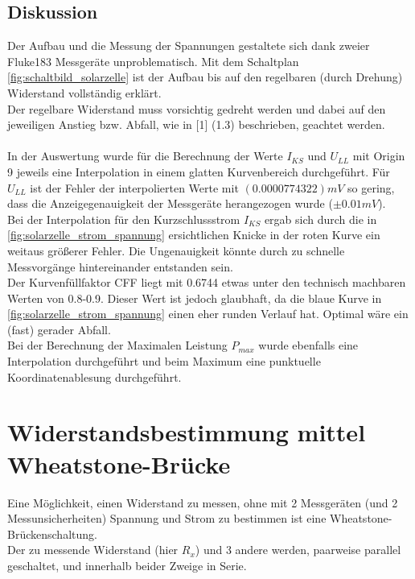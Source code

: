 \documentclass[12pt,a4paper]{article}
\begin{document}
\begin{multicols}{2}

\subsection{Diskussion}
Der Aufbau und  die Messung der Spannungen gestaltete sich dank zweier Fluke183 Messgeräte unproblematisch. 
Mit dem Schaltplan \ref{fig:schaltbild_solarzelle} ist der Aufbau bis auf den regelbaren (durch Drehung) Widerstand vollständig erklärt. \\
Der regelbare Widerstand muss vorsichtig gedreht werden und dabei auf den jeweiligen Anstieg bzw. Abfall, wie in [1] (1.3) beschrieben, geachtet werden. \\
\\
In der Auswertung wurde für die Berechnung der Werte $I_{KS}$ und $U_{LL}$ mit Origin 9 jeweils eine Interpolation in einem glatten Kurvenbereich durchgeführt. Für $U_{LL}$ ist der Fehler der interpolierten Werte mit 
$(0.0000774322) mV$ so gering, dass die Anzeigegenauigkeit der Messgeräte herangezogen wurde ($\pm 0.01mV$).\\
Bei der Interpolation für den Kurzschlussstrom $I_{KS}$ ergab sich durch die in \ref{fig:solarzelle_strom_spannung} ersichtlichen Knicke in der roten Kurve ein weitaus größerer Fehler. Die Ungenauigkeit könnte durch zu schnelle Messvorgänge hintereinander entstanden sein.\\
Der Kurvenfüllfaktor CFF liegt mit 0.6744 etwas unter den technisch machbaren Werten von 0.8-0.9. Dieser Wert ist jedoch glaubhaft, da die blaue Kurve in \ref{fig:solarzelle_strom_spannung} einen eher runden Verlauf hat. Optimal wäre ein (fast) gerader Abfall.\\
Bei der Berechnung der Maximalen Leistung $P_{max}$ wurde ebenfalls eine Interpolation durchgeführt und beim Maximum eine punktuelle Koordinatenablesung durchgeführt.\\


\section{Widerstandsbestimmung mittel Wheatstone-Brücke}

Eine Möglichkeit, einen Widerstand zu messen, ohne mit 2 Messgeräten (und 2 Messunsicherheiten) Spannung und Strom zu bestimmen ist eine Wheatstone-Brückenschaltung.
\\
Der zu messende Widerstand (hier $R_x$) und 3 andere werden, paarweise parallel geschaltet, und innerhalb beider Zweige in Serie. 


\end{multicols}
\end{document}
